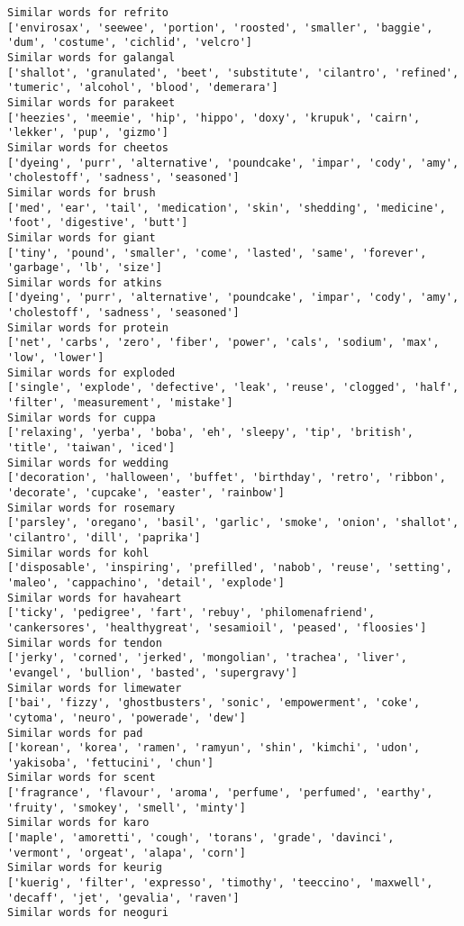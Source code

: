 \documentclass[11pt]{article}
\begin{document}
\begin{Verbatim}[commandchars=\\\{\}]
Similar words for refrito
['envirosax', 'seewee', 'portion', 'roosted', 'smaller', 'baggie', 'dum', 'costume', 'cichlid', 'velcro']
Similar words for galangal
['shallot', 'granulated', 'beet', 'substitute', 'cilantro', 'refined', 'tumeric', 'alcohol', 'blood', 'demerara']
Similar words for parakeet
['heezies', 'meemie', 'hip', 'hippo', 'doxy', 'krupuk', 'cairn', 'lekker', 'pup', 'gizmo']
Similar words for cheetos
['dyeing', 'purr', 'alternative', 'poundcake', 'impar', 'cody', 'amy', 'cholestoff', 'sadness', 'seasoned']
Similar words for brush
['med', 'ear', 'tail', 'medication', 'skin', 'shedding', 'medicine', 'foot', 'digestive', 'butt']
Similar words for giant
['tiny', 'pound', 'smaller', 'come', 'lasted', 'same', 'forever', 'garbage', 'lb', 'size']
Similar words for atkins
['dyeing', 'purr', 'alternative', 'poundcake', 'impar', 'cody', 'amy', 'cholestoff', 'sadness', 'seasoned']
Similar words for protein
['net', 'carbs', 'zero', 'fiber', 'power', 'cals', 'sodium', 'max', 'low', 'lower']
Similar words for exploded
['single', 'explode', 'defective', 'leak', 'reuse', 'clogged', 'half', 'filter', 'measurement', 'mistake']
Similar words for cuppa
['relaxing', 'yerba', 'boba', 'eh', 'sleepy', 'tip', 'british', 'title', 'taiwan', 'iced']
Similar words for wedding
['decoration', 'halloween', 'buffet', 'birthday', 'retro', 'ribbon', 'decorate', 'cupcake', 'easter', 'rainbow']
Similar words for rosemary
['parsley', 'oregano', 'basil', 'garlic', 'smoke', 'onion', 'shallot', 'cilantro', 'dill', 'paprika']
Similar words for kohl
['disposable', 'inspiring', 'prefilled', 'nabob', 'reuse', 'setting', 'maleo', 'cappachino', 'detail', 'explode']
Similar words for havaheart
['ticky', 'pedigree', 'fart', 'rebuy', 'philomenafriend', 'cankersores', 'healthygreat', 'sesamioil', 'peased', 'floosies']
Similar words for tendon
['jerky', 'corned', 'jerked', 'mongolian', 'trachea', 'liver', 'evangel', 'bullion', 'basted', 'supergravy']
Similar words for limewater
['bai', 'fizzy', 'ghostbusters', 'sonic', 'empowerment', 'coke', 'cytoma', 'neuro', 'powerade', 'dew']
Similar words for pad
['korean', 'korea', 'ramen', 'ramyun', 'shin', 'kimchi', 'udon', 'yakisoba', 'fettucini', 'chun']
Similar words for scent
['fragrance', 'flavour', 'aroma', 'perfume', 'perfumed', 'earthy', 'fruity', 'smokey', 'smell', 'minty']
Similar words for karo
['maple', 'amoretti', 'cough', 'torans', 'grade', 'davinci', 'vermont', 'orgeat', 'alapa', 'corn']
Similar words for keurig
['kuerig', 'filter', 'expresso', 'timothy', 'teeccino', 'maxwell', 'decaff', 'jet', 'gevalia', 'raven']
Similar words for neoguri

\end{Verbatim}
\end{document}
